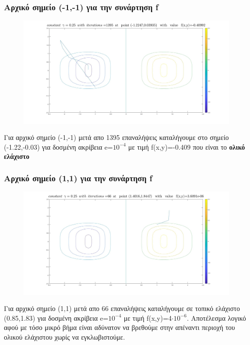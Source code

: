 \documentclass{article}
\begin{document}
\subsubsection*{Αρχικό σημείο (-1,-1) για την συνάρτηση f}
\begin{figure}[h!]	
     \centering  
     \advance\leftskip-0.2cm  
  \includegraphics[width=130mm,scale=2]{l2.jpg}
\end{figure} 
Για αρχικό σημείο (-1,-1) μετά απο 1395 επαναλήψεις καταλήγουμε στο σημείο (-1.22,-0.03) για  δοσμένη ακρίβεια e=$10^{-4}$ με τιμή f(x,y)=-0.409 που είναι  το \textbf{ολικό ελάχιστο}
\clearpage
\subsubsection*{Αρχικό σημείο (1,1) για την συνάρτηση f}
\begin{figure}[h!]	
     \centering  
     \advance\leftskip-0.2cm  
  \includegraphics[width=130mm,scale=2]{l3.jpg}
\end{figure} 
Για αρχικό σημείο (1,1) μετά απο 66 επαναλήψεις καταλήγουμε σε τοπικό ελάχιστο (0.85,1.83) για δοσμένη ακρίβεια e=$10^{-4}$ με τιμή f(x,y)=4$\cdot 10^{-6}$. Αποτέλεσμα λογικό αφού με τόσο μικρό βήμα είναι αδύνατον να βρεθούμε στην απέναντι περιοχή του ολικού ελάχιστου χωρίς να εγκλωβιστούμε.
\newpage
\end{document}
